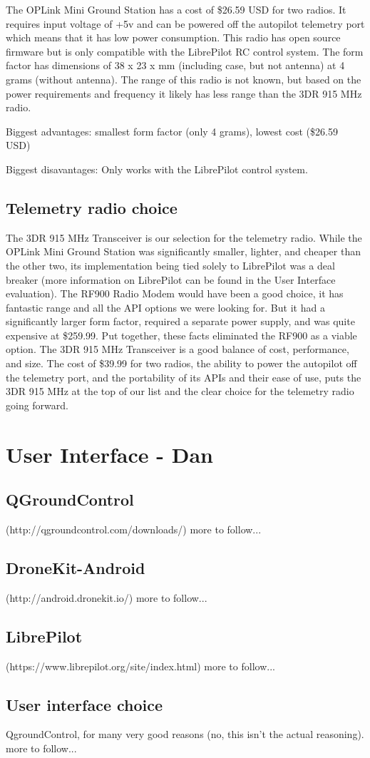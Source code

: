 \documentclass[compsoc,draftclsnofoot,onecolumn,10pt]{IEEEtran}
\begin{document}
The OPLink Mini Ground Station has a cost of \$26.59 USD for two radios. It
requires input voltage of +5v and can be powered off the autopilot telemetry
port which means that it has low power consumption. This radio has open source
firmware but is only compatible with the LibrePilot RC control system. 
The form factor has dimensions of 38 x 23 x mm (including case, but not
antenna) at 4 grams (without antenna).
The range of this radio is not known, but based on the power requirements and
frequency it likely has less range than the 3DR 915 MHz radio.

Biggest advantages: smallest form factor (only 4 grams), lowest cost (\$26.59
USD)

Biggest disavantages: Only works with the LibrePilot control system.


\subsection{Telemetry radio choice}
The 3DR 915 MHz Transceiver is our selection for the telemetry radio.
While the OPLink Mini Ground Station was significantly smaller, lighter, and
cheaper than the other two, its implementation being tied solely to LibrePilot
was a deal breaker (more information on LibrePilot can be found in the User
Interface evaluation).
The RF900 Radio Modem would have been a good choice, it has fantastic range
and all the API options we were looking for. But it had a significantly larger
form factor, required a separate power supply, and was quite expensive at
\$259.99. Put together, these facts eliminated the RF900 as a viable option.
The 3DR 915 MHz Transceiver is a good balance of cost, performance, and size. The
cost of \$39.99 for two radios, the ability to power the autopilot off the
telemetry port, and the portability of its APIs and their ease of use, puts the
3DR 915 MHz at the top of our list and the clear choice for the telemetry
radio going forward.

\section{User Interface - Dan}

\subsection{QGroundControl}
(http://qgroundcontrol.com/downloads/)
more to follow...

\subsection{DroneKit-Android}
(http://android.dronekit.io/)
more to follow...

\subsection{LibrePilot}
(https://www.librepilot.org/site/index.html)
more to follow...

\subsection{User interface choice}
QgroundControl, for many very good reasons (no, this isn't the actual reasoning).
more to follow...
\end{document}
